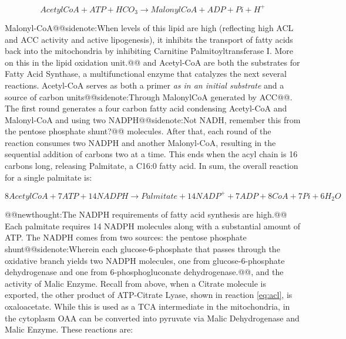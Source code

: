 \documentclass{tufte-handout}
\makeatletter
\def\newthought#1{@@newthought:#1@@}
\def\sidenote#1{@@sidenote:#1@@}
\makeatother
\begin{document}
\begin{equation}\label{eq:acc}
AcetylCoA + ATP + HCO_3 \rightarrow MalonylCoA + ADP + Pi + H^+
\end{equation}


Malonyl-CoA\sidenote{When levels of this lipid are high (reflecting high ACL and ACC activity and active lipogenesis), it inhibits the transport of fatty acids back into the mitochondria by inhibiting Carnitine Palmitoyltransferase I.  More on this in the lipid oxidation unit.} and Acetyl-CoA are both the substrates for Fatty Acid Synthase, a multifunctional enzyme that catalyzes the next several reactions.  Acetyl-CoA serves as both a primer \emph{as in an initial substrate} and a source of carbon units\sidenote{Through MalonylCoA generated by ACC}.  The first round generates a four carbon fatty acid condensing Acetyl-CoA and Malonyl-CoA and using two NADPH\sidenote{Not NADH, remember this from the pentose phosphate shunt?} molecules. After that, each round of the reaction consumes two NADPH and another Malonyl-CoA, resulting in the sequential addition of carbons two at a time.  This ends when the acyl chain is 16 carbons long, releasing Palmitate, a C16:0 fatty acid. In sum, the overall reaction for a single palmitate is:

\begin{equation}\label{eq:pamitate-overall}
8 AcetylCoA + 7 ATP + 14 NADPH \rightarrow Palmitate + 14 NADP^+ + 7 ADP + 8 CoA  + 7 Pi + 6H_2O
\end{equation}


\newthought{The NADPH requirements of fatty acid synthesis are high.}  Each palmitate requires 14 NADPH molecules along with a substantial amount of ATP.  The NADPH comes from two sources: the pentose phosphate shunt\sidenote{Wherein each glucose-6-phosphate that passes through the oxidative branch yields two NADPH molecules, one from glucose-6-phosphate dehydrogenase and one from 6-phosphogluconate dehydrogenase.}, and the activity of Malic Enzyme. Recall from above, when a Citrate molecule is exported, the other product of ATP-Citrate Lyase, shown in reaction \ref{eq:acl}, is oxaloacetate.  While this is used as a TCA intermediate in the mitochondria, in the cytoplasm OAA can be converted into pyruvate via Malic Dehydrogenase and Malic Enzyme.  These reactions are:
\end{document}
